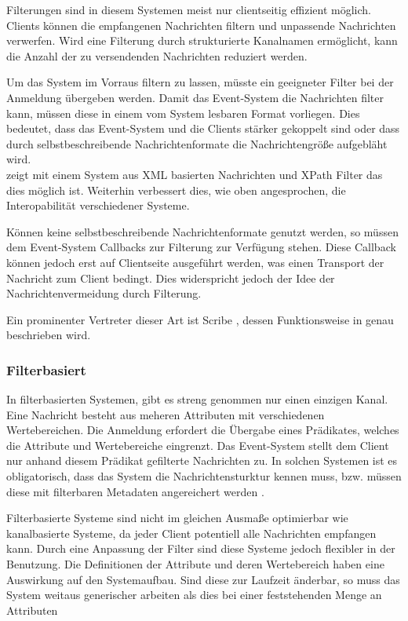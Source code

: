 Filterungen sind in diesem Systemen meist nur clientseitig effizient möglich. Clients können die empfangenen Nachrichten filtern und unpassende Nachrichten verwerfen. Wird eine Filterung durch strukturierte Kanalnamen ermöglicht, kann die Anzahl der zu versendenden Nachrichten reduziert werden.

Um das System im Vorraus filtern zu lassen, müsste ein geeigneter Filter bei der Anmeldung übergeben werden. Damit das Event-System die Nachrichten filter kann, müssen diese in einem vom System lesbaren Format vorliegen. Dies bedeutet, dass das Event-System und die Clients stärker gekoppelt sind oder dass durch selbstbeschreibende Nachrichtenformate die Nachrichtengröße aufgebläht wird.\\
\cite{PiEyKoSh2007-PubSubAPI} zeigt mit einem System aus XML basierten Nachrichten und XPath Filter das dies möglich ist. Weiterhin verbessert dies, wie oben angesprochen, die Interopabilität verschiedener Systeme.

Können keine selbstbeschreibende Nachrichtenformate genutzt werden, so müssen dem Event-System Callbacks zur Filterung zur Verfügung stehen. Diese Callback können jedoch erst auf Clientseite ausgeführt werden, was einen Transport der Nachricht zum Client bedingt. Dies widerspricht jedoch der Idee der Nachrichtenvermeidung durch Filterung.

Ein prominenter Vertreter dieser Art ist Scribe \cite{Castro2002Scribe}, dessen Funktionsweise in  genau beschrieben wird.

\subsubsection{Filterbasiert}
\label{chap:grundlagen:pubsub:filterbased}
In filterbasierten Systemen, gibt es streng genommen nur einen einzigen Kanal. Eine Nachricht besteht aus meheren Attributen mit verschiedenen Wertebereichen. Die Anmeldung erfordert die Übergabe eines Prädikates, welches die Attribute und Wertebereiche eingrenzt. Das Event-System stellt dem Client nur anhand diesem Prädikat gefilterte Nachrichten zu. In solchen Systemen ist es obligatorisch, dass das System die Nachrichtensturktur kennen muss, bzw. müssen diese mit filterbaren Metadaten angereichert werden \cite{PiEyKoSh2007-PubSubAPI}.

Filterbasierte Systeme sind nicht im gleichen Ausmaße optimierbar wie kanalbasierte Systeme, da jeder Client potentiell alle Nachrichten empfangen kann. Durch eine Anpassung der Filter sind diese Systeme jedoch flexibler in der Benutzung. Die Definitionen der Attribute und deren Wertebereich haben eine Auswirkung auf den Systemaufbau. Sind diese zur Laufzeit änderbar, so muss das System weitaus generischer arbeiten als dies bei einer feststehenden Menge an Attributen

